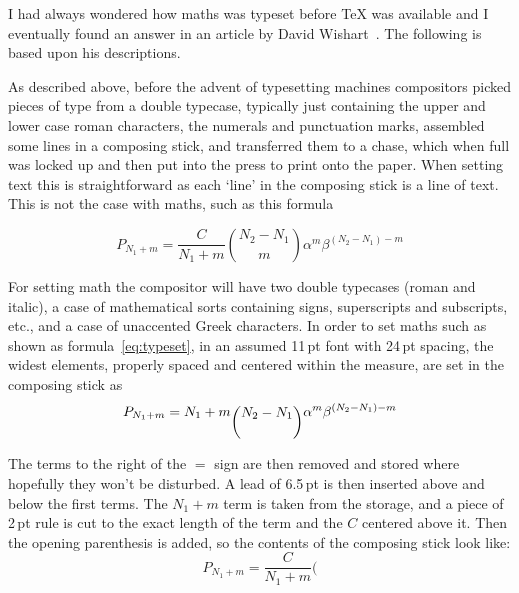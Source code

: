 \documentclass[10pt,a4paper,oneside,extrafontsizes]{memoir}%
\newcommand\U[2]{\textrm{#1}\,\textrm{#2}}
\begin{document}
\begin{paracol}{2}
\switchEng
    I had always wondered how maths was typeset before TeX was available and
I eventually found an answer in an article by David Wishart~\autocite{WISHART03}.
The following is based upon his descriptions.

    As described above, before the advent of typesetting machines compositors 
picked pieces of type from a double typecase, 
typically just containing the 
upper and lower case roman characters, the numerals and punctuation marks, 
assembled some lines in a composing stick, 
and transferred them to a chase, which when full was locked 
up and then 
put into the press to print onto the paper. When setting text this is
straightforward as each `line' in the composing stick is a line of text.
This is not the case with maths, such as this formula

\begin{equation} \label{eq:typeset}
P_{N_1 + m} = \frac{C}{N_{1} + m} \binom{N_{2} - N_{1}}{m}
              \alpha^{m}\beta^{(N_{2}-N_{1}) - m}
\end{equation}

    For setting math the compositor will have two double 
typecases (roman
and italic), a case of mathematical sorts containing signs, superscripts
and subscripts, etc., and a case of unaccented Greek characters.
    In order to set maths such as shown as formula~\ref{eq:typeset},
in an assumed \U{11}{pt} font with \U{24}{pt} spacing, 
the widest elements, properly spaced and centered within the measure, 
are set in the composing stick as
\begin{displaymath}
P_{N_1 + m} = N_{1} + m \raisebox{-0.6\baselineskip}{$\displaystyle\binom{N_{2} - N_{1}}{\phantom{m}}$}
              \alpha^{m}\beta^{(N_{2}-N_{1}) - m}
\end{displaymath}

    The terms to the right of the $=$ sign are then removed and stored where
hopefully they won't be disturbed. A lead of \U{6.5}{pt} is then inserted above and below 
the first terms.
The $N_{1} +m$ term is taken from the storage, and a piece of \U{2}{pt} rule is cut
to the exact length of the term and the $C$ centered above it. Then the opening
parenthesis is added, so the contents of the composing stick look like:
\begin{displaymath}
P_{N_1 + m} = \frac{C}{N_{1} + m} \bigg(
\end{displaymath}


\end{paracol}
\end{document}
